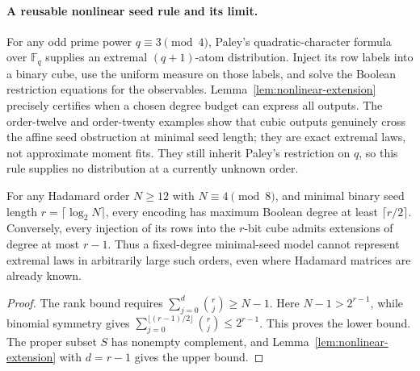 \paragraph{A reusable nonlinear seed rule and its limit.}
For any odd prime power $q\equiv3\pmod4$, Paley's quadratic-character
formula over $\mathbb F_q$ supplies an extremal $(q+1)$-atom distribution.
Inject its row labels into a binary cube, use the uniform measure on
those labels, and solve the Boolean restriction equations for the
observables. Lemma~\ref{lem:nonlinear-extension} precisely certifies when
a chosen degree budget can express all outputs. The order-twelve and
order-twenty examples show that cubic outputs genuinely cross the affine
seed obstruction at minimal seed length; they are exact extremal laws,
not approximate moment fits. They still inherit Paley's restriction on
$q$, so this rule supplies no distribution at a currently unknown order.

\begin{corollary}
\label{cor:nonlinear-growing-degree}
For any Hadamard order $N\ge12$ with $N\equiv4\pmod8$, and minimal
binary seed length $r=\lceil\log_2N\rceil$, every encoding has maximum
Boolean degree at least $\lceil r/2\rceil$. Conversely, every injection
of its rows into the $r$-bit cube admits extensions of degree at most
$r-1$. Thus a fixed-degree minimal-seed model cannot represent extremal
laws in arbitrarily large such orders, even where Hadamard matrices
are already known.
\end{corollary}
\begin{proof}
The rank bound requires $\sum_{j=0}^d\binom rj\ge N-1$.
Here $N-1>2^{r-1}$, while binomial symmetry gives
$\sum_{j=0}^{\lfloor(r-1)/2\rfloor}\binom rj\le2^{r-1}$.
This proves the lower bound. The proper subset $S$ has nonempty
complement, and Lemma~\ref{lem:nonlinear-extension} with $d=r-1$
gives the upper bound.
\end{proof}
